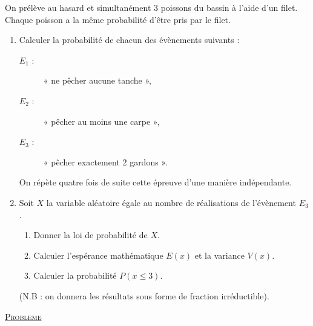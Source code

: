       On prélève au hasard et simultanément 3 poissons du bassin à l'aide d'un filet. Chaque poisson a la même
      probabilité d’être pris par le filet.
      \begin{enumerate}
            \item Calculer la probabilité de chacun des évènements suivants :
                  \begin{description}
                        \item[$E_1$ :] « ne pêcher aucune tanche »,
                        \item[$E_2$ :] « pêcher au moins une carpe »,
                        \item[$E_3$ :] « pêcher exactement 2 gardons ».
                  \end{description}
                  On répète quatre fois de suite cette épreuve d’une manière indépendante.
            \item Soit $X$ la variable aléatoire égale au nombre de réalisations de l’évènement $E_3$.
                  \begin{enumerate}
                        \item Donner la loi de probabilité de $X$.
                        \item Calculer l’espérance mathématique $E(x)$ et la variance $V(x)$.
                        \item Calculer la probabilité $P(x \leq 3)$.
                  \end{enumerate}
            (N.B : on donnera les résultats sous forme de fraction irréductible).
      \end{enumerate}
\noindent \underline{\textsc{Probleme}} 
